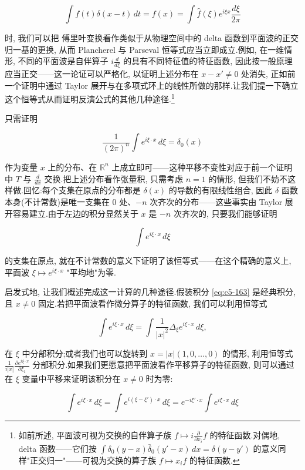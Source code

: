 \[
\int f(t)\delta(x-t)\, dt = f(x) = \int\hat{f}(\xi)e^{i\xi x}\frac{d\xi}{2\pi}
\]

时, 我们可以把 傅里叶变换看作类似于从物理空间中的 delta 函数到平面波的正交归一基的更换, 从而 Plancherel 与 Parseval 恒等式应当立即成立.例如, 在一维情形, 不同的平面波是自伴算子 $i\frac{d}{d\xi}$ 的具有不同特征值的特征函数, 因此按一般原理应当正交——这一论证可以严格化, 以证明上述分布在 $x-x'\neq 0$ 处消失, 正如前一个证明中通过 Taylor 展开与在多项式环上的线性所做的那样.让我们提一下确立这个恒等式从而证明反演公式的其他几种途径.\footnote{如前所述, 平面波可视为交换的自伴算子族 $f\mapsto i\frac{\partial}{\partial x_i}f$ 的特征函数.对偶地, delta 函数——它们按 $\int\delta_0(y-x)\bar{\delta}_0(y'-x)\, dx = \delta(y-y')$ 的意义同样"正交归一"——可视为交换的算子族 $f\mapsto x_if$ 的特征函数.}

只需证明

\[
\frac{1}{(2\pi)^n}\int e^{i\xi\cdot x}\, d\xi = \delta_0(x)
\]

作为变量 $x$ 上的分布、在 $\mathbb{R}^n$ 上成立即可——这种平移不变性对应于前一个证明中 $T$ 与 $\frac{d}{dx}$ 交换.把上述分布看作张量积, 只需考虑 $n = 1$ 的情形, 但我们不妨不这样做.回忆:每个支集在原点的分布都是 $\delta(x)$ 的导数的有限线性组合, 因此 $\delta$ 函数本身(不计常数)是唯一支集在 $0$ 处、$-n$ 次齐次的分布——这些事实由 Taylor 展开容易建立.由于左边的积分显然关于 $x$ 是 $-n$ 次齐次的, 只要我们能够证明

\begin{equation}
\int e^{i\xi\cdot x}\, d\xi\label{eq:c5-163}
\end{equation}

的支集在原点, 就在不计常数的意义下证明了该恒等式——在这个精确的意义上, 平面波 $\xi\mapsto e^{i\xi\cdot x}$ "平均地"为零.

启发式地, 让我们概述完成这一计算的几种途径.假装积分 \eqref{eq:c5-163} 是经典积分, 且 $x\neq 0$ 固定.若把平面波看作微分算子的特征函数, 我们可以利用恒等式

\[
\int e^{i\xi\cdot x}\, d\xi = \int\frac{1}{|x|^2}\Delta_\xi e^{i\xi\cdot x}\, d\xi,
\]

在 $\xi$ 中分部积分;或者我们也可以旋转到 $x = |x|(1, 0, \ldots, 0)$ 的情形, 利用恒等式 $\frac{1}{i|x|}\frac{\partial e^{i\xi\cdot x}}{\partial\xi_1}$ 分部积分.如果我们更愿意把平面波看作平移算子的特征函数, 则可以通过在 $\xi$ 变量中平移来证明该积分在 $x\neq 0$ 时为零:

\[
\int e^{i\xi\cdot x}\, d\xi = \int e^{i(\xi-\xi')\cdot x}\, d\xi = e^{-i\xi'\cdot x}\int e^{i\xi\cdot x}\, d\xi
\]


